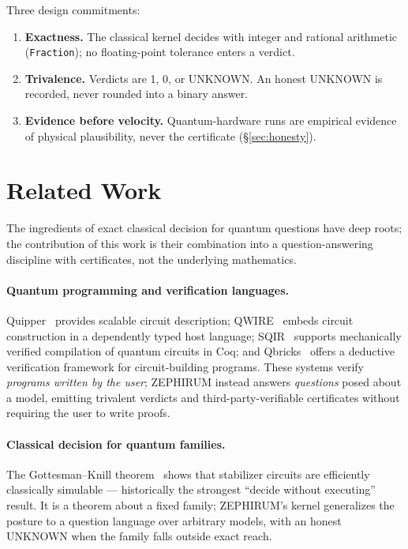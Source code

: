 \documentclass[11pt]{article}
\begin{document}
Three design commitments:
\begin{enumerate}
  \item \textbf{Exactness.} The classical kernel decides with integer and
  rational arithmetic (\texttt{Fraction}); no floating-point tolerance
  enters a verdict.
  \item \textbf{Trivalence.} Verdicts are 1, 0, or UNKNOWN. An honest
  UNKNOWN is recorded, never rounded into a binary answer.
  \item \textbf{Evidence before velocity.} Quantum-hardware runs are
  empirical evidence of physical plausibility, never the certificate
  (\S\ref{sec:honesty}).
\end{enumerate}

\section{Related Work}
\label{sec:related}
The ingredients of exact classical decision for quantum questions have deep
roots; the contribution of this work is their combination into a
question-answering discipline with certificates, not the underlying
mathematics.

\paragraph{Quantum programming and verification languages.}
Quipper~\cite{quipper} provides scalable circuit description; QWIRE~\cite{qwire}
embeds circuit construction in a dependently typed host language; SQIR~\cite{sqir}
supports mechanically verified compilation of quantum circuits in Coq; and
Qbricks~\cite{qbricks} offers a deductive verification framework for
circuit-building programs. These systems verify \emph{programs written by the
user}; ZEPHIRUM instead answers \emph{questions} posed about a model, emitting
trivalent verdicts and third-party-verifiable certificates without requiring
the user to write proofs.

\paragraph{Classical decision for quantum families.}
The Gottesman--Knill theorem~\cite{gottesman} shows that stabilizer circuits
are efficiently classically simulable --- historically the strongest
``decide without executing'' result. It is a theorem about a fixed family;
ZEPHIRUM's kernel generalizes the posture to a question language over arbitrary
models, with an honest UNKNOWN when the family falls outside exact reach.
\end{document}
